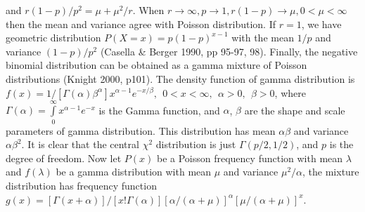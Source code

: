 and $r(1-p)/p^2=\mu+\mu^2/r$.  When $r\rightarrow \infty, p\rightarrow 1,
r(1-p)\rightarrow \mu, 0< \mu <\infty$ then the mean and variance agree with
Poisson distribution.  If $r=1$, we have geometric distribution
$P(X=x)=p(1-p)^{x-1}$ with the mean $1/p$ and variance $(1-p)/p^2$ (Casella \&
Berger 1990, pp 95-97, 98).  Finally, the negative binomial distribution can be
obtained as a gamma mixture of Poisson distributions (Knight 2000, p101).  The
density function of gamma distribution is $f(x)
=1/[\Gamma(\alpha)\beta^{\alpha}]x^{\alpha-1}e^{-x/\beta}, ~~ 0<x<\infty,
~~\alpha>0, ~~\beta>0 $, where $\Gamma(\alpha)=\int\limits_0^\infty
x^{\alpha-1}e^{-x}$ is the Gamma function, and $\alpha$, $\beta$ are the shape
and scale parameters of gamma distribution.  This distribution has mean
$\alpha\beta$ and variance $\alpha\beta^2$.  It is clear that the central
$\chi^2$ distribution is just $\Gamma(p/2,1/2)$, and $p$ is the degree of
freedom.  Now let $P(x)$ be a Poisson frequency function with mean $\lambda$
and $f(\lambda)$ be a gamma distribution with mean $\mu$ and variance
$\mu^2/\alpha$, the mixture distribution has frequency function
$g(x)=[\Gamma(x+\alpha)]/[x!\Gamma(\alpha)] [\alpha/(\alpha+\mu)]^\alpha
[\mu/(\alpha+\mu)]^x$.
